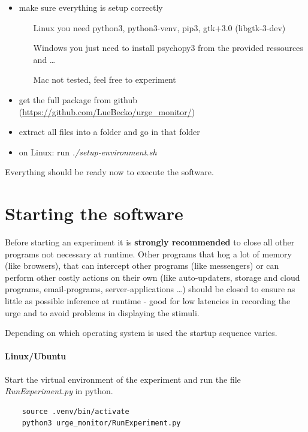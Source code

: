 \documentclass[12pt,a4paper]{book}
\begin{document}
\begin{itemize}
	\item make sure everything is setup correctly
	\begin{itemize}
		\item[Linux] you need python3, python3-venv, pip3, gtk+3.0 (libgtk-3-dev)
		\item[Windows] you just need to install psychopy3 from the provided ressources and \dots
		\item[Mac] not tested, feel free to experiment
	\end{itemize}
	\item get the full package from github (\url{https://github.com/LueBecko/urge_monitor/})
	\item extract all files into a folder and go in that folder
	\item on Linux: run \textit{./setup-environment.sh}
\end{itemize}

Everything should be ready now to execute the software.

\section{Starting the software}

Before starting an experiment it is \textbf{strongly recommended} to close all other programs not necessary at runtime. Other programs that hog a lot of memory (like browsers), that can intercept other programs (like messengers) or can perform other costly actions on their own (like auto-updaters, storage and cloud programs, email-programs, server-applications \dots) should be closed to ensure as little as possible inference at runtime - good for low latencies in recording the urge and to avoid problems in displaying the stimuli.

Depending on which operating system is used the startup sequence varies.

\paragraph{Linux/Ubuntu}

Start the virtual environment of the experiment and run the file \emph{RunExperiment.py} in python.

\begin{verbatim}
	source .venv/bin/activate
	python3 urge_monitor/RunExperiment.py
\end{verbatim}
\end{document}
